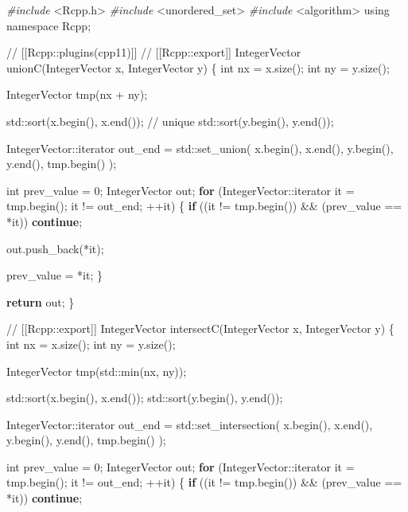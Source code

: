 \documentclass[
]{krantz}
\makeatletter
\newenvironment{Shaded}{\begin{snugshade}}{\end{snugshade}}
\newcommand{\BuiltInTok}[1]{#1}
\newcommand{\CommentTok}[1]{\textcolor[rgb]{0.56,0.35,0.01}{\textit{#1}}}
\newcommand{\ControlFlowTok}[1]{\textcolor[rgb]{0.13,0.29,0.53}{\textbf{#1}}}
\newcommand{\DataTypeTok}[1]{\textcolor[rgb]{0.13,0.29,0.53}{#1}}
\newcommand{\DecValTok}[1]{\textcolor[rgb]{0.00,0.00,0.81}{#1}}
\newcommand{\ImportTok}[1]{#1}
\newcommand{\KeywordTok}[1]{\textcolor[rgb]{0.13,0.29,0.53}{\textbf{#1}}}
\newcommand{\NormalTok}[1]{#1}
\newcommand{\PreprocessorTok}[1]{\textcolor[rgb]{0.56,0.35,0.01}{\textit{#1}}}
\newenvironment{kframe}{%
\medskip{}
\setlength{\fboxsep}{.8em}
 \def\at@end@of@kframe{}%
 \ifinner\ifhmode%
  \def\at@end@of@kframe{\end{minipage}}%
  \begin{minipage}{\columnwidth}%
 \fi\fi%
 \def\FrameCommand##1{\hskip\@totalleftmargin \hskip-\fboxsep
 \colorbox{shadecolor}{##1}\hskip-\fboxsep
     \hskip-\linewidth \hskip-\@totalleftmargin \hskip\columnwidth}%
 \MakeFramed {\advance\hsize-\width
   \@totalleftmargin\z@ \linewidth\hsize
   \@setminipage}}%
 {\par\unskip\endMakeFramed%
 \at@end@of@kframe}
\renewenvironment{Shaded}{\begin{kframe}}{\end{kframe}}
\renewcommand{\KeywordTok} [1]{\textcolor[rgb]{0.00,0.44,0.13}{{#1}}}
\renewcommand{\DataTypeTok}[1]{\textcolor[rgb]{0.56,0.13,0.00}{{#1}}}
\renewcommand{\DecValTok}  [1]{\textcolor[rgb]{0.25,0.63,0.44}{{#1}}}
\renewcommand{\CommentTok} [1]{\textcolor[rgb]{0.38,0.63,0.69}{{#1}}}
\renewcommand{\NormalTok}  [1]{{#1}}
\makeatother
\begin{document}
\begin{Shaded}
\begin{Highlighting}[]
\PreprocessorTok{#include }\ImportTok{<Rcpp.h>}
\PreprocessorTok{#include }\ImportTok{<unordered_set>}
\PreprocessorTok{#include }\ImportTok{<algorithm>}
\KeywordTok{using} \KeywordTok{namespace}\NormalTok{ Rcpp;}

\CommentTok{// [[Rcpp::plugins(cpp11)]]}
\CommentTok{// [[Rcpp::export]]}
\NormalTok{IntegerVector unionC(IntegerVector x, IntegerVector y) \{}
  \DataTypeTok{int}\NormalTok{ nx = x.size();}
  \DataTypeTok{int}\NormalTok{ ny = y.size();}
  
\NormalTok{  IntegerVector tmp(nx + ny);}
  
  \BuiltInTok{std::}\NormalTok{sort(x.begin(), x.end()); }\CommentTok{// unique}
  \BuiltInTok{std::}\NormalTok{sort(y.begin(), y.end());}
  
\NormalTok{  IntegerVector::iterator out_end = }\BuiltInTok{std::}\NormalTok{set_union(}
\NormalTok{    x.begin(), x.end(), y.begin(), y.end(), tmp.begin()}
\NormalTok{  );}
  
  \DataTypeTok{int}\NormalTok{ prev_value = }\DecValTok{0}\NormalTok{;}
\NormalTok{  IntegerVector out;}
  \ControlFlowTok{for}\NormalTok{ (IntegerVector::iterator it = tmp.begin();}
\NormalTok{       it != out_end; ++it) \{}
    \ControlFlowTok{if}\NormalTok{ ((it != tmp.begin())  && (prev_value == *it)) }\ControlFlowTok{continue}\NormalTok{;}
    
\NormalTok{    out.push_back(*it);}
    
\NormalTok{    prev_value = *it;}
\NormalTok{  \}}
  
  \ControlFlowTok{return}\NormalTok{ out;}
\NormalTok{\}}

\CommentTok{// [[Rcpp::export]]}
\NormalTok{IntegerVector intersectC(IntegerVector x, IntegerVector y) \{}
  \DataTypeTok{int}\NormalTok{ nx = x.size();}
  \DataTypeTok{int}\NormalTok{ ny = y.size();}
  
\NormalTok{  IntegerVector tmp(}\BuiltInTok{std::}\NormalTok{min(nx, ny));}
  
  \BuiltInTok{std::}\NormalTok{sort(x.begin(), x.end());}
  \BuiltInTok{std::}\NormalTok{sort(y.begin(), y.end());}
  
\NormalTok{  IntegerVector::iterator out_end = }\BuiltInTok{std::}\NormalTok{set_intersection(}
\NormalTok{    x.begin(), x.end(), y.begin(), y.end(), tmp.begin()}
\NormalTok{  );}
  
  \DataTypeTok{int}\NormalTok{ prev_value = }\DecValTok{0}\NormalTok{;  }
\NormalTok{  IntegerVector out;}
  \ControlFlowTok{for}\NormalTok{ (IntegerVector::iterator it = tmp.begin();}
\NormalTok{       it != out_end; ++it) \{}
    \ControlFlowTok{if}\NormalTok{ ((it != tmp.begin()) && (prev_value == *it)) }\ControlFlowTok{continue}\NormalTok{;}
    

\end{Highlighting}
\end{Shaded}
\end{document}
